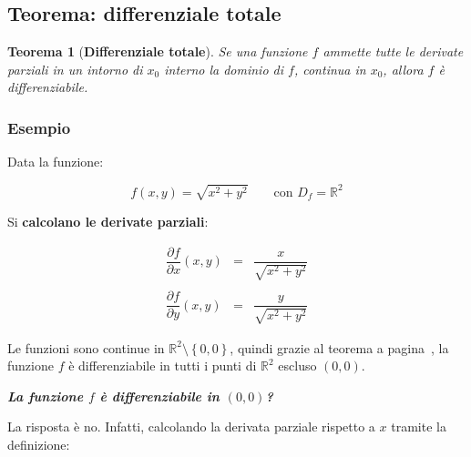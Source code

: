 \documentclass[a4paper]{article}
\newtheorem{theorem}{Teorema}
\begin{document}
	\subsection[Teorema: differenziale totale]{\textcolor{Red3}{Teorema: differenziale totale}}
	
	\begin{theorem}[\textbf{Differenziale totale}]\label{teorema: differenziale totale}
		Se una funzione $f$ ammette tutte le derivate parziali in un intorno di $x_{0}$ interno la dominio di $f$, continua in $x_{0}$, allora $f$ è differenziabile.
	\end{theorem}

	\newpage
	
	\subsubsection[Esempio]{\textcolor{Green4}{Esempio}}
	
	Data la funzione:
	
	\begin{equation*}
		f\left(x,y\right) = \sqrt{x^{2} + y^{2}} \hspace{2em} \text{con } D_{f} = \mathbb{R}^{2}
	\end{equation*}

	\noindent
	Si \textbf{calcolano le derivate parziali}:
	
	\begin{equation*}
		\begin{array}{lll}
			\dfrac{\partial f}{\partial x}\left(x,y\right) & = & \dfrac{x}{\sqrt{x^{2} + y^{2}}} \\
			&& \\
			\dfrac{\partial f}{\partial y}\left(x,y\right) & = & \dfrac{y}{\sqrt{x^{2} + y^{2}}}
		\end{array}
	\end{equation*}
	
	\noindent
	Le funzioni sono continue in $\mathbb{R}^{2} \setminus \left\{0,0\right\}$, quindi grazie al teorema a pagina~\pageref{teorema: differenziabilità implica continuità}, la funzione $f$ è differenziabile in tutti i punti di $\mathbb{R}^{2}$ escluso $\left(0,0\right)$.\newline
	
	\noindent
	\textcolor{Red3}{\textbf{\emph{La funzione $f$ è differenziabile in $\left(0,0\right)$?}}}\newline
	
	\noindent
	La risposta è no. Infatti, calcolando la derivata parziale rispetto a $x$ tramite la definizione:
	
\end{document}
